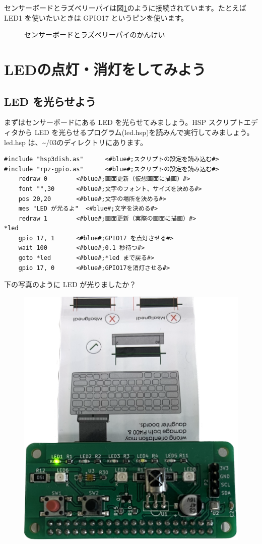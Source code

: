 センサーボードとラズベリーパイは図\ref{sensors}のように接続されています。たとえば LED1 を使いたいときは GPIO17 というピンを使います。

\begin{figure}[H]
    \centering
    
    \caption{センサーボードとラズベリーパイのかんけい}
    \label{sensors}
\end{figure}

\section{LEDの点灯・消灯をしてみよう}
\subsection{LED を光らせよう}

まずはセンサーボードにある LED を光らせてみましょう。HSP スクリプトエディタから LED を光らせるプログラム(led.hsp)を読みんで実行してみましょう。led.hsp は、\textasciitilde /03のディレクトリにあります。\\

\begin{lstlisting}[caption=led.hsp,label=led.hsp]
#include "hsp3dish.as"		<#blue#;スクリプトの設定を読み込む#>
#include "rpz-gpio.as"		<#blue#;スクリプトの設定を読み込む#>
	redraw 0		<#blue#;画面更新（仮想画面に描画）#>
	font "",30		<#blue#;文字のフォント、サイズを決める#>
	pos 20,20		<#blue#;文字の場所を決める#>
	mes "LED が光るよ"	<#blue#;文字を決める#>
	redraw 1		<#blue#;画面更新（実際の画面に描画）#>
*led
	gpio 17, 1		<#blue#;GPIO17 を点灯させる#>
	wait 100		<#blue#;0.1 秒待つ#>
	goto *led		<#blue#;*led まで戻る#>
	gpio 17, 0		<#blue#;GPIO17を消灯させる#>
\end{lstlisting}

下の写真のように LED が光りましたか？\\

\begin{figure}[H]
    \centering
    \includegraphics[width=0.5\linewidth]{images/chap03/led_emission_demo.png}
\end{figure}

